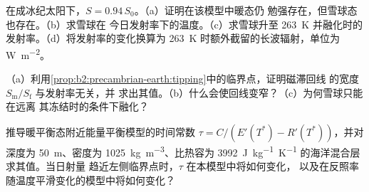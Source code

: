 \begin{exercise}[$\star\star\star$]\label{exo:b2:precambrian-earth:10}
在成冰纪太阳下，$S = 0.94\,S_0$。（a）证明在该模型中暖态仍
勉强存在，但雪球态也存在。（b）求雪球在
今日发射率下的温度。（c）求雪球升至 \qty{263}{K} 并融化时的
发射率。（d）将发射率的变化换算为
\qty{263}{K} 时额外截留的长波辐射，单位为 \unit{W.m^{-2}}。
\end{exercise}

\begin{exercise}[$\star\star\star$]\label{exo:b2:precambrian-earth:11}
（a）利用\cref{prop:b2:precambrian-earth:tipping}中的临界点，证明磁滞回线
的宽度 $S_{\text{m}}/S_{\text{f}}$ 与发射率无关，并
求出其值。（b）什么会使回线变窄？（c）为何雪球只能在远离
其冻结时的条件下融化？
\end{exercise}

\begin{exercise}[$\star\star\star$]\label{exo:b2:precambrian-earth:12}
推导暖平衡态附近能量平衡模型的时间常数 $\tau =
C/(E'(T^*) - R'(T^*))$，并对深度为 \qty{50}{m}、密度为
\qty{1025}{kg.m^{-3}}、比热容为 \qty{3992}{J.kg^{-1}.K^{-1}} 的海洋混合层求其值。当日射量
趋近左侧临界点时，$\tau$ 在本模型中将如何变化，
以及在反照率随温度平滑变化的模型中将如何变化？
\end{exercise}

